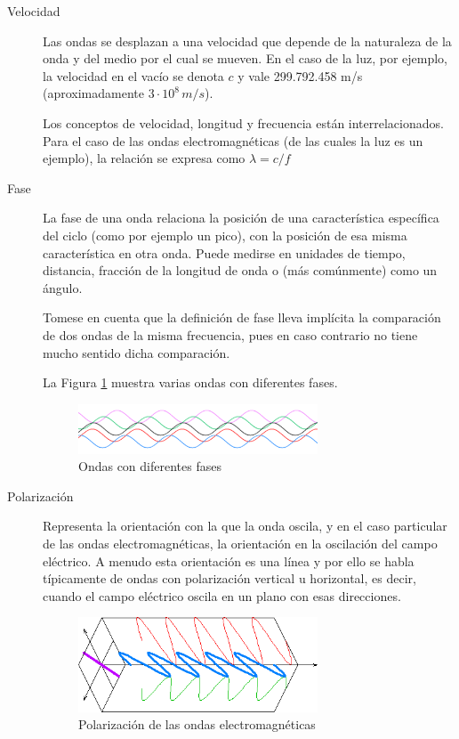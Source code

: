 \begin{description}
\item [Velocidad] Las ondas se desplazan a una velocidad que depende de la naturaleza de la onda y del medio por el cual se mueven. En el caso de la luz, por ejemplo, la velocidad en el vac\'io se denota $c$ y vale 299.792.458 m/s (aproximadamente $3 \cdot 10^8 \, m/s$).

Los conceptos de velocidad, longitud y frecuencia est\'an interrelacionados. Para el caso de las ondas electromagn\'eticas (de las cuales la luz es un ejemplo), la relaci\'on se expresa como $ \lambda = c / f $


\item [Fase] La fase de una onda relaciona la posici\'on de una caracter\'istica espec\'ifica del ciclo (como por ejemplo un pico), con la posici\'on de esa misma caracter\'istica en otra onda. Puede medirse en unidades de tiempo, distancia, fracci\'on de la longitud de onda o (m\'as com\'unmente) como un \'angulo.

Tomese en cuenta que la definici\'on de fase lleva impl\'icita la comparaci\'on de dos ondas de la misma frecuencia, pues en caso contrario no tiene mucho sentido dicha comparaci\'on.

La Figura \ref{fig:desfase-ondas} muestra varias ondas con diferentes fases. 

\begin{figure}[!h]
  \centering
  \includegraphics[width=0.7\textwidth]{./Imagenes/06.01.adf/desfase-ondas.png}
  \caption{Ondas con diferentes fases \cite{wikipedia_esp}}
  \label{fig:desfase-ondas}
\end{figure}



\item [Polarizaci\'on] Representa la orientaci\'on con la que la onda oscila, y en el caso particular de las ondas electromagn\'eticas, la orientaci\'on en la oscilaci\'on del campo el\'ectrico. A menudo esta orientaci\'on es una l\'inea y por ello se habla t\'ipicamente de ondas con polarizaci\'on vertical u horizontal, es decir, cuando el campo el\'ectrico oscila en un plano con esas direcciones. 


  \begin{figure}[!h]
    \centering
  \includegraphics[width=0.7\textwidth]{./Imagenes/06.01.adf/polarizacion-ondas.png}    
    \caption{Polarizaci\'on de las ondas electromagn\'eticas \cite{wikipedia_esp}}
    \label{fig:polarizacion-ondas}
  \end{figure}


\end{description}
